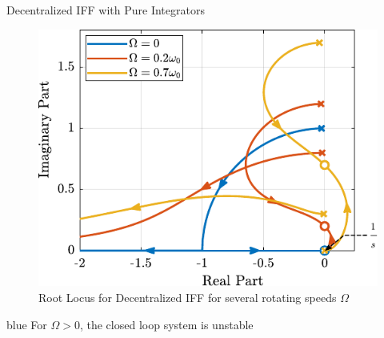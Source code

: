 \documentclass[t, minted]{clean-beamer}
\begin{document}
\begin{frame}[label={sec:orge6035da}]{Decentralized IFF with Pure Integrators}
\begin{figure}[htbp]
\centering
\includegraphics[width=0.7\linewidth]{figs/root_locus_pure_iff.pdf}
\caption{Root Locus for Decentralized IFF for several rotating speeds \(\Omega\)}
\end{figure}

\vspace{-1em}

\begin{cbox}[]{blue}{}
\centering For \(\Omega > 0\), the closed loop system is unstable
\end{cbox}
\end{frame}
\end{document}
